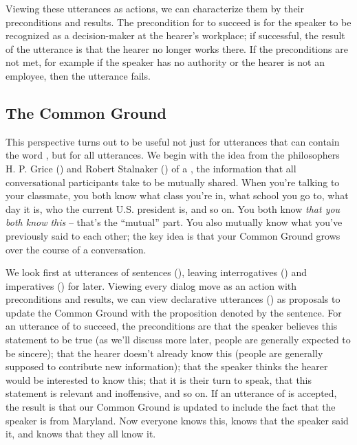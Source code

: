 Viewing these utterances as actions, we can characterize them by their preconditions and results.  The precondition for  to succeed is for the speaker to be recognized as a decision-maker at the hearer's workplace; if successful, the result of the utterance is that the hearer no longer works there.   If the preconditions are not met, for example if the speaker has no authority or the hearer is not an employee, then the utterance fails.  

\subsection{The Common Ground}

This perspective turns out to be useful not just for utterances that can contain the word , but for all utterances.  We begin with the idea from the philosophers H. P. Grice (\citeyear{grice:89}) and Robert Stalnaker (\citeyear{Stalnaker:2002}) of a , the  information that all conversational participants take to be mutually shared.  When you're talking to your classmate, you both know what class you're in, what school you go to, what day it is, who the current U.S. president is, and so on.  You both know \emph{that you both know this} -- that's the ``mutual'' part.  You also mutually know what you've previously said to each other; the key idea is that your Common Ground grows over the course of a conversation.

We look first at utterances of  sentences (), leaving interrogatives () and imperatives () for later.  Viewing every dialog move as an action with preconditions and results, we can view declarative utterances () as proposals to update the Common Ground with the proposition denoted by the sentence. For an utterance of  to succeed, the preconditions are that the speaker believes this statement to be true (as we'll discuss more later, people are generally expected to be sincere); that the hearer doesn't already know this (people are generally supposed to contribute new information);  that the speaker thinks the hearer would be interested to know this; that it is their turn to speak, that this statement is relevant and inoffensive, and so on.  If an utterance of  is accepted, the result is that our Common Ground is updated to include the fact that the speaker is from Maryland.  Now everyone knows this, knows that the speaker said it, and knows that they all know it. 

